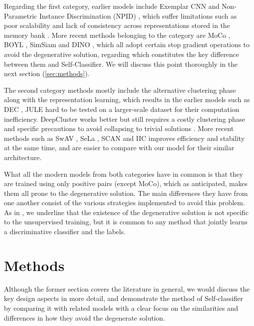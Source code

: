 \documentclass{article}
\begin{document}
Regarding the first category, earlier models include Exemplar CNN \cite{cnn} and Non-Parametric Instance Discrimination (NPID) \cite{npid}, which suffer limitations such as poor scalability and lack of consistency across representations stored in the memory bank \cite{self_classifier}. More recent methods belonging to the category are MoCo \cite{moco}, BOYL \cite{byol}, SimSiam \cite{simsiam} and DINO \cite{dino}, which all adopt certain stop gradient operations to avoid the degenerative solution, regarding which constitutes the key difference between them and Self-Classifier. We will discuss this point thoroughly in the next section (\autoref{sec:methods}).

The second category methods mostly include the alternative clustering phase along with the representation learning, which results in the earlier models such as DEC \cite{dec}, JULE \cite{jule} hard to be tested on a larger-scale dataset for their computation inefficiency. DeepCluster works better but still requires a costly clustering phase and specific precautions to avoid collapsing to trivial solutions \cite{byol}. More recent methods such as SwAV \cite{swav}, SeLa \cite{sela}, SCAN \cite{scan} and IIC \cite{iic} improves efficiency and stability at the same time, and are easier to compare with our model for their similar architecture. 

What all the modern models from both categories have in common is that they are trained using only positive pairs (except MoCo), which as anticipated, makes them all prone to the degenerative solution. The main differences they have from one another consist of the various strategies implemented to avoid this problem. As in \cite{deepcluster}, we underline that the existence of the degenerative solution is not specific to the unsupervised training, but it is common to any method that jointly learns a discriminative classifier and the labels. 


\section{Methods}
\label{sec:methods}
Although the former section covers the literature in general, we would discuss the key design aspects in more detail, and demonstrate the method of Self-classifier by comparing it with related models with a clear focus on the similarities and differences in how they avoid the degenerate solution.
\end{document}

